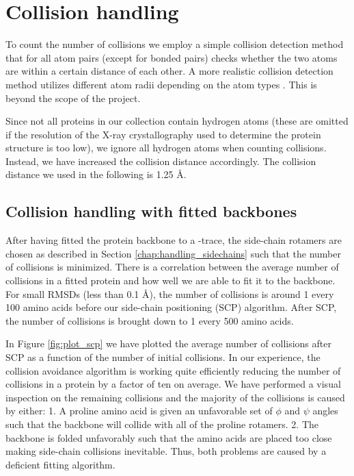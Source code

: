 \section{Collision handling}
To count the number of collisions we employ a simple collision detection method that for all atom pairs (except for bonded pairs) checks whether the two atoms are within a certain distance of each other.
A more realistic collision detection method utilizes different atom radii depending on the atom types \cite{bondi1964van}. 
This is beyond the scope of the project.

Since not all proteins in our collection contain hydrogen atoms (these are omitted if the resolution of the X-ray crystallography used to determine the protein structure is too low), we ignore all hydrogen atoms when counting collisions.
Instead, we have increased the collision distance accordingly.
The collision distance we used in the following is 1.25 Å.

\subsection{Collision handling with fitted backbones}
After having fitted the protein backbone to a \Ca-trace, the side-chain rotamers are chosen as described in Section \ref{chap:handling_sidechains} such that the number of collisions is minimized.
There is a correlation between the average number of collisions in a fitted protein and how well we are able to fit it to the backbone. 
For small RMSDs (less than 0.1 Å), the number of collisions is around 1 every 100 amino acids before our side-chain positioning (SCP) algorithm.
After SCP, the number of collisions is brought down to 1 every 500 amino acids.

In Figure \ref{fig:plot_scp} we have plotted the average number of collisions after SCP as a function of the number of initial collisions.
In our experience, the collision avoidance algorithm is working quite efficiently reducing the number of collisions in a protein by a factor of ten on average. 
We have performed a visual inspection on the remaining collisions and the majority of the collisions is caused by either: 
1. A proline amino acid is given an unfavorable set of $\phi$ and $\psi$ angles such that the backbone will collide with all of the proline rotamers.
2. The backbone is folded unfavorably such that the amino acids are placed too close making side-chain collisions inevitable.
Thus, both problems are caused by a deficient fitting algorithm.

